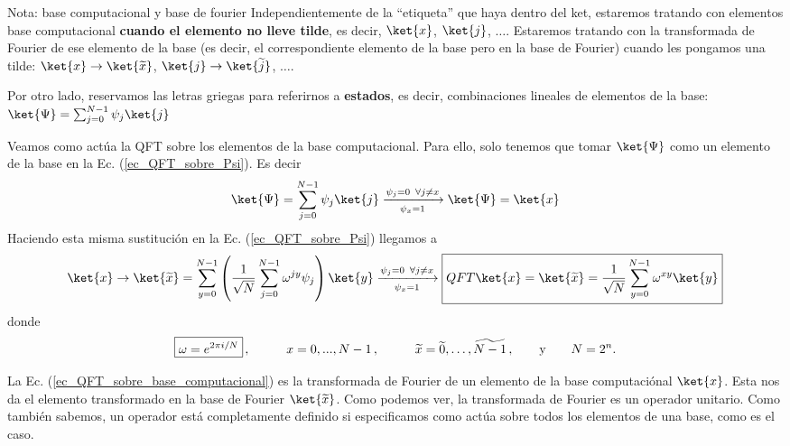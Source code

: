 \documentclass[a4paper,11pt]{book} %
\numberwithin{equation}{chapter}
\def\lp{\left(}
\def\rp{\right)}
\begin{document}
	\begin{mybox_blue}{Nota: base computacional y base de fourier}
	Independientemente de la ``etiqueta'' que haya dentro del ket, estaremos tratando con elementos base computacional \textbf{cuando el elemento no lleve tilde}, 
	es decir, $\ket{x}$, $\ket{j}$, $\dots$. Estaremos tratando con la transformada de Fourier de ese elemento de la base (es decir, el correspondiente elemento de 
	la base pero en la base de Fourier) cuando les pongamos una tilde: $\ket{x} \to \ket{\widetilde{x}}$, $\ket{j} \to \ket{\widetilde{j}}$, $\dots$.
	
	Por otro lado, reservamos las letras griegas para referirnos a \textbf{estados}, es decir, combinaciones lineales de elementos de la base: $ \ket{\Psi} = \sum_{j=0}^{N-1} \psi_j \ket{j}$
	\end{mybox_blue} 

Veamos como actúa la QFT sobre los elementos de la base computacional. Para ello, solo tenemos que tomar $\ket{\Psi}$ como un elemento de la base en la Ec. (\ref{ec_QFT_sobre_Psi}). Es decir
	\begin{equation}
	\ket{\Psi} = \sum_{j=0}^{N-1} \psi_j \ket{j} \xrightarrow[\psi_x = 1]{\psi_j = 0 \,\,\, \forall  j \neq x} \ket{\Psi} = \ket{x}
	\end{equation}
	Haciendo esta misma sustitución en la Ec. (\ref{ec_QFT_sobre_Psi}) llegamos a
	\begin{equation} \label{ec_QFT_sobre_base_computacional}
	\ket{x} \to \ket{\widetilde{x}} = \sum_{y=0}^{N-1} \lp \frac{1}{\sqrt{N}} \sum_{j=0}^{N-1} \omega^{jy} \psi_j \rp \ket{y} 
	\xrightarrow[\psi_x = 1]{\psi_j = 0 \,\,\,  \forall j \neq x} 
	\boxed{QFT \ket{x} = \ket{\widetilde{x}} = \frac{1}{\sqrt{N}}  \sum_{y=0}^{N-1}  \omega^{xy}   \ket{y} }
	\end{equation}	
	donde 
	\begin{equation}
	\boxed{\omega  = e^{2\pi i  /N}} \, , \hspace{1cm}
	x   = 0,...,N-1 \, , \hspace{1cm}
	\widetilde{x}  = \widetilde{0}, \dots, \widetilde{N-1} \, ,\hspace{0.7cm}  \text{y} \hspace{0.7cm}
	N=2^n.
	\end{equation}		

La Ec. (\ref{ec_QFT_sobre_base_computacional}) es la transformada de Fourier de un elemento de la base computaciónal $\ket{x}$. Esta nos da el elemento transformado en la base de Fourier $\ket{\widetilde{x}}$. Como podemos ver, la transformada de Fourier es un operador unitario. Como también sabemos, un operador está completamente definido si especificamos como actúa sobre todos los elementos de una base, como es el caso.
\end{document}
